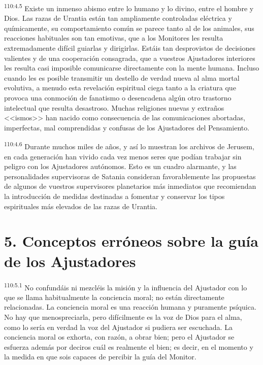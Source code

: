 \par
\textsuperscript{110:4.5} Existe un inmenso abismo entre lo humano y lo divino, entre el hombre y Dios. Las razas de Urantia están tan ampliamente controladas eléctrica y químicamente, su comportamiento común se parece tanto al de los animales, sus reacciones habituales son tan emotivas, que a los Monitores les resulta extremadamente difícil guiarlas y dirigirlas. Estáis tan desprovistos de decisiones valientes y de una cooperación consagrada, que a vuestros Ajustadores interiores les resulta casi imposible comunicarse directamente con la mente humana. Incluso cuando les es posible transmitir un destello de verdad nueva al alma mortal evolutiva, a menudo esta revelación espiritual ciega tanto a la criatura que provoca una conmoción de fanatismo o desencadena algún otro trastorno intelectual que resulta desastroso. Muchas religiones nuevas y extraños <<ismos>> han nacido como consecuencia de las comunicaciones abortadas, imperfectas, mal comprendidas y confusas de los Ajustadores del Pensamiento.

\par
\textsuperscript{110:4.6} Durante muchos miles de años, y así lo muestran los archivos de Jerusem, en cada generación han vivido cada vez menos seres que podían trabajar sin peligro con los Ajustadores autónomos. Esto es un cuadro alarmante, y las personalidades supervisoras de Satania consideran favorablemente las propuestas de algunos de vuestros supervisores planetarios más inmediatos que recomiendan la introducción de medidas destinadas a fomentar y conservar los tipos espirituales más elevados de las razas de Urantia.

\section*{5. Conceptos erróneos sobre la guía de los Ajustadores}
\par
\textsuperscript{110:5.1} No confundáis ni mezcléis la misión y la influencia del Ajustador con lo que se llama habitualmente la conciencia moral; no están directamente relacionadas. La conciencia moral es una reacción humana y puramente psíquica. No hay que menospreciarla, pero difícilmente es la voz de Dios para el alma, como lo sería en verdad la voz del Ajustador si pudiera ser escuchada. La conciencia moral os exhorta, con razón, a obrar bien; pero el Ajustador se esfuerza además por deciros cuál es realmente el bien; es decir, en el momento y la medida en que sois capaces de percibir la guía del Monitor.

